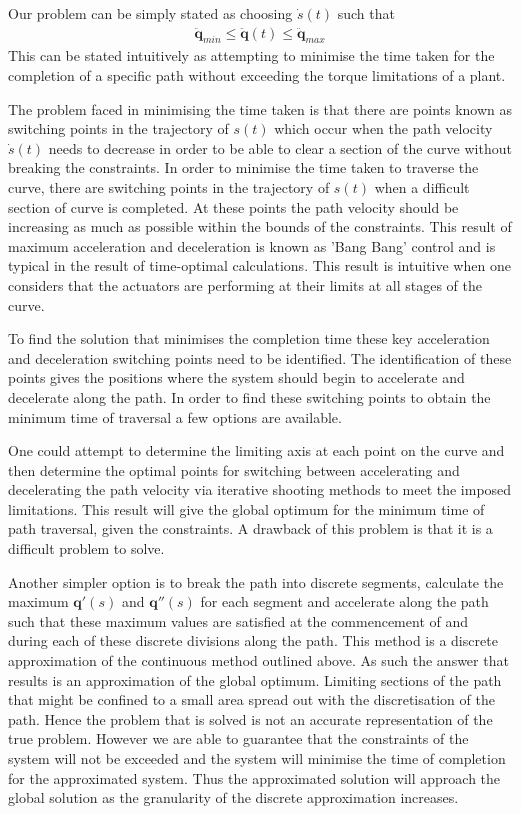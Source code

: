 Our problem can be simply stated as choosing $\dot{s}(t)$ such that 
\begin{align*}
\ddot{\textbf{q}}_{min} \leq \ddot{\textbf{q}}(t) \leq \ddot{\textbf{q}}_{max}
\end{align*} 
This can be stated intuitively as attempting to minimise the time taken for the completion of a specific path without exceeding the torque limitations of a plant.

The problem faced in minimising the time taken is that there are points known as switching points in the trajectory of $s(t)$ which occur when the path velocity $\dot{s}(t)$ needs to decrease in order to be able to clear a section of the curve without breaking the constraints. In order to minimise the time taken to traverse the curve, there are switching points in the trajectory of $s(t)$ when a difficult section of curve is completed. At these points the path velocity should be increasing as much as possible within the bounds of the constraints. This result of maximum acceleration and deceleration is known as 'Bang Bang' control and is typical in the result of time-optimal calculations. This result is intuitive when one considers that the actuators are performing at their limits at all stages of the curve.
 
To find the solution that minimises the completion time these key acceleration and deceleration switching points need to be identified. The identification of these points gives the positions where the system should begin to accelerate and decelerate along the path.
In order to find these switching points to obtain the minimum time of traversal a few options are available.

One could attempt to determine the limiting axis at each point on the curve and then determine the optimal points for switching between accelerating and decelerating the path velocity via iterative shooting methods to meet the imposed limitations. This result will give the global optimum for the minimum time of path traversal, given the constraints. A drawback of this problem is that it is a difficult problem to solve.

Another simpler option is to break the path into discrete segments, calculate the maximum $\textbf{q}'(s)$ and $\textbf{q}''(s)$ for each segment and accelerate along the path such that these maximum values are satisfied at the commencement of and during each of these discrete divisions along the path. This method is a discrete approximation of the continuous method outlined above. As such the answer that results is an approximation of the global optimum. Limiting sections of the path that might be confined to a small area spread out with the discretisation of the path. Hence the problem that is solved is not an accurate representation of the true problem. However we are able to guarantee that the constraints of the system will not be exceeded and the system will minimise the time of completion for the approximated system. Thus the approximated solution will approach the global solution as the granularity of the discrete approximation increases.

